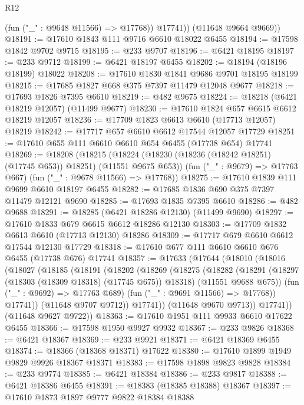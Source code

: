 \begin{lexlean}{R12}
\begin{coremodule}
{{{{{{{{{{{{{{{{{{{{{{{{{{{{{{{{{{{{{{{{{{{{{{{{{{{{{{{{{{{{{{{{{{{{{{{{{{{{{{{{{{            (fun ("_" : @9648 @11566) => @17768))
          @17741))
      (@11648 @9664 @9669))
@18191 := @17610 @1843 @111 @9716 @6610 @18022 @6455
@18194 := @17598 @1842 @9702 @9715
@18195 := @233 @9707
@18196 := @6421 @18195
@18197 := @233 @9712
@18199 := @6421 @18197 @6455
@18202 := @18194 (@18196 @18199) @18022
@18208 := @17610 @1830 @1841 @9686 @9701 @18195 @18199
@18215 := @17685 @1827 @668 @375 @7397 @11479 @12048 @9677
@18218 := @17693 @1826 @7395 @6610
@18219 := @482 @9675
@18224 := @18218 (@6421 @18219 @12057) (@11499 @9677)
@18230 := @17610 @1824 @657 @6615 @6612 @18219 @12057
@18236 := @17709 @1823 @6613 @6610 (@17713 @12057) @18219
@18242 := @17717 @657 @6610 @6612 @17544 @12057 @17729
@18251 := @17610 @655 @111 @6610 @6610 @654 @6455 (@17738 @654) @17741
@18269 := @18208
    (@18215
      (@18224 (@18230 (@18236 (@18242 @18251) (@17745 @653)) @18251) (@11551 @9675 @653))
      (fun ("_" : @9679) => @17763 @667)
      (fun ("_" : @9678 @11566) => @17768))
@18275 := @17610 @1839 @111 @9699 @6610 @18197 @6455
@18282 := @17685 @1836 @690 @375 @7397 @11479 @12121 @9690
@18285 := @17693 @1835 @7395 @6610
@18286 := @482 @9688
@18291 := @18285 (@6421 @18286 @12130) (@11499 @9690)
@18297 := @17610 @1833 @679 @6615 @6612 @18286 @12130
@18303 := @17709 @1832 @6613 @6610 (@17713 @12130) @18286
@18309 := @17717 @679 @6610 @6612 @17544 @12130 @17729
@18318 := @17610 @677 @111 @6610 @6610 @676 @6455 (@17738 @676) @17741
@18357 := @17633
    (@17644
      (@18010
        (@18016
          (@18027
            (@18185
              (@18191
                (@18202
                  (@18269
                    (@18275
                      (@18282
                        (@18291
                          (@18297 (@18303 (@18309 @18318) (@17745 @675)) @18318)
                          (@11551 @9688 @675))
                        (fun ("_" : @9692) => @17763 @689)
                        (fun ("_" : @9691 @11566) => @17768))
                      @17741))
                  (@11648 @9707 @9712))
                @17741))
            (@11648 @9670 @9713))
          @17741))
      (@11648 @9627 @9722))
@18363 := @17610 @1951 @111 @9933 @6610 @17622 @6455
@18366 := @17598 @1950 @9927 @9932
@18367 := @233 @9826
@18368 := @6421 @18367
@18369 := @233 @9921
@18371 := @6421 @18369 @6455
@18374 := @18366 (@18368 @18371) @17622
@18380 := @17610 @1899 @1949 @9829 @9926 @18367 @18371
@18383 := @17598 @1898 @9823 @9828
@18384 := @233 @9774
@18385 := @6421 @18384
@18386 := @233 @9817
@18388 := @6421 @18386 @6455
@18391 := @18383 (@18385 @18388) @18367
@18397 := @17610 @1873 @1897 @9777 @9822 @18384 @18388
}}}}}}}}}}}}}}}}}}}}}}}}}}}}}}}}}}}}}}}}}}}}}}}}}}}}}}}}}}}}}}}}}}}}}}}}}}}}}}}}}}
\end{coremodule}
\end{lexlean}
